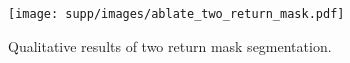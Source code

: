 \begin{figure}[t]
\centering
\texttt{[image: supp/images/ablate\_two\_return\_mask.pdf]}

\caption{Qualitative results of two return mask segmentation.}
\label{fig:iccv_supp_ablate_two_return_mask}

\end{figure}